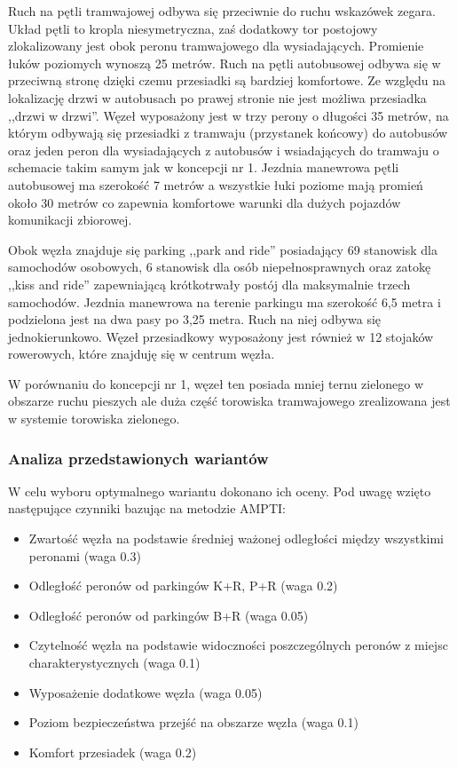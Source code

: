 \documentclass[twoside,12pt]{article}
\begin{document}
		Ruch na pętli tramwajowej odbywa się przeciwnie do ruchu wskazówek zegara. Układ pętli to kropla niesymetryczna, zaś dodatkowy tor postojowy zlokalizowany jest obok peronu tramwajowego dla wysiadających. Promienie łuków poziomych wynoszą 25 metrów. Ruch na pętli autobusowej odbywa się w przeciwną stronę dzięki czemu przesiadki są bardziej komfortowe. Ze względu na lokalizację drzwi w autobusach po prawej stronie nie jest możliwa przesiadka ,,drzwi w drzwi''. Węzeł wyposażony jest w trzy perony o długości 35 metrów, na którym odbywają się przesiadki z tramwaju (przystanek końcowy) do autobusów oraz jeden peron dla wysiadających z autobusów i wsiadających do tramwaju o schemacie takim samym jak w koncepcji nr 1. Jezdnia manewrowa pętli autobusowej ma szerokość 7 metrów a wszystkie łuki poziome mają promień około 30 metrów co zapewnia komfortowe warunki dla dużych pojazdów komunikacji zbiorowej.
		
		Obok węzła znajduje się parking ,,park and ride'' posiadający 69 stanowisk dla samochodów osobowych, 6 stanowisk dla osób niepełnosprawnych oraz zatokę ,,kiss and ride'' zapewniającą krótkotrwały postój dla maksymalnie trzech samochodów. Jezdnia manewrowa na terenie parkingu ma szerokość 6,5 metra i podzielona jest na dwa pasy po 3,25 metra. Ruch na niej odbywa się jednokierunkowo. Węzeł przesiadkowy wyposażony jest również w 12 stojaków rowerowych, które znajduję się w centrum węzła.
		
		W porównaniu do koncepcji nr 1, węzeł ten posiada mniej ternu zielonego w obszarze ruchu pieszych ale duża część torowiska tramwajowego zrealizowana jest w systemie torowiska zielonego.
		
		\subsubsection{Analiza przedstawionych wariantów}
		
		W celu wyboru optymalnego wariantu dokonano ich oceny. Pod uwagę wzięto następujące czynniki bazując na metodzie AMPTI:
		\begin{itemize}\setlength{\itemsep}{0em}
		\item Zwartość węzła na podstawie średniej ważonej odległości między wszystkimi peronami (waga 0.3)
		\item Odległość peronów od parkingów K+R, P+R (waga 0.2)
		\item Odległość peronów od parkingów B+R (waga 0.05)
		\item Czytelność węzła na podstawie widoczności poszczególnych peronów z miejsc charakterystycznych (waga 0.1)
		\item Wyposażenie dodatkowe węzła (waga 0.05)
		\item Poziom bezpieczeństwa przejść na obszarze węzła (waga 0.1)
		\item Komfort przesiadek (waga 0.2)
		\end{itemize}
		
\end{document}
